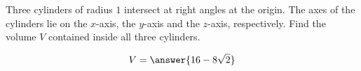 \documentclass{ximera}
\author{David Guichard \and Neal Koblitz \and H. Jerome Keisler \and Albert Scheller \and Barry Balof \and Mike Wills \and Matthew Carr}
\begin{document}
\begin{exercise}




Three cylinders of radius $1$ intersect at right angles at the origin. The axes of the cylinders lie on the $x$-axis, the $y$-axis and the $z$-axis, respectively. Find the volume $V$ contained inside all three cylinders.
\begin{prompt}
\[
V=\answer{16-8\sqrt{2}}
\]
\end{prompt}



\end{exercise}
\end{document}
